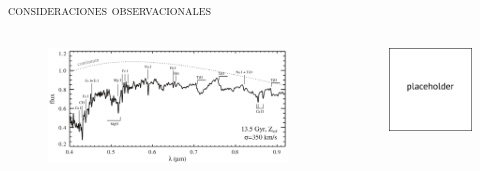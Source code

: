 \documentclass[xcolor=dvipsnames,fleqn,hyperref={colorlinks,citecolor=black,linkcolor=black,urlcolor=black}]{beamer}
\begin{document}
\begin{frame}{\textsc{consideraciones observacionales}}

\begin{columns}


\begin{figure}
\includegraphics[scale=0.33]{img/conroy2014-1}
\end{figure}

\begin{figure}
\includegraphics[scale=0.5]{img/placeholder}
\end{figure}
\end{columns}


\end{frame}
\end{document}
